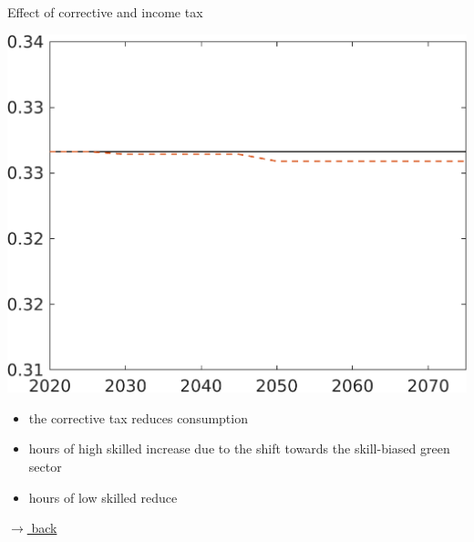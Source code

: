 \documentclass[11pt,aspectratio=169]{beamer}
\begin{document}
\begin{frame}{Effect of corrective and income tax}
\begin{minipage}[]{0.3\textwidth}
	\end{minipage}
	\begin{minipage}[]{0.3\textwidth}
		\includegraphics[width=1\textwidth]{../codding_model/own_basedOnFried/optimalPol_elastS_DisuSci/figures/all_1705/CompCounterFac_withLF_noopt_taufopt1_taulopt0_hl_spillover0_noskill0_sep1_BN0_ineq0_red0_xgrowth0_etaa0.79_lgd0.png}
	\end{minipage}
	
	\vspace{3mm}
	\begin{itemize}
		\item the corrective tax reduces consumption
		\item hours of high skilled increase due to the shift towards the skill-biased green sector
		\item hours of low skilled reduce
	\end{itemize}

\vspace{-3mm}
\hfill
\hyperlink{effalloback}{\tiny{$\rightarrow$ back}} 
\end{frame}
\end{document}

